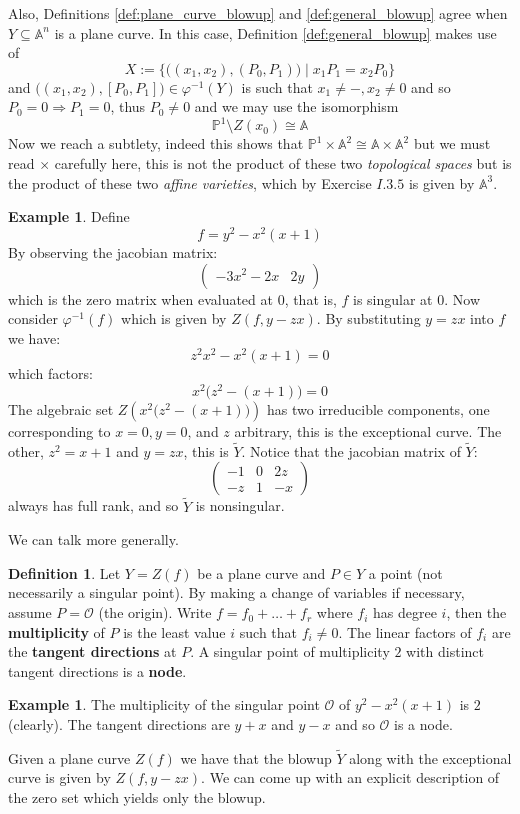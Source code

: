 \documentclass[12pt]{article}
\theoremstyle{plain}
\theoremstyle{definition}
\newtheorem{defn}[thm]{Definition} %
\newtheorem{example}[thm]{Example}
\newcommand{\bb}[1]{\mathbb{#1}}
\newcommand{\call}[1]{\mathcal{#1}}
\begin{document}
Also, Definitions \ref{def:plane_curve_blowup} and \ref{def:general_blowup} agree when $Y \subseteq \bb{A}^n$ is a plane curve. In this case, Definition \ref{def:general_blowup} makes use of
\[X := \lbrace \big((x_1,x_2),(P_0,P_1)\big) \mid x_1 P_1 = x_2 P_0\rbrace\]
and $\big((x_1,x_2),[P_0,P_1]\big) \in \varphi^{-1}(Y)$ is such that $x_1 \neq -, x_2 \neq 0$ and so $P_0 = 0 \Rightarrow P_1 = 0$, thus $P_0 \neq 0$ and we may use the isomorphism
\[\bb{P}^1\setminus Z(x_0) \cong \bb{A}\]
Now we reach a subtlety, indeed this shows that $\bb{P}^1 \times \bb{A}^2 \cong \bb{A} \times \bb{A}^2$ but we must read $\times$ carefully here, this is not the product of these two \emph{topological spaces} but is the product of these two \emph{affine varieties}, which by Exercise $I.3.5$ is given by $\bb{A}^3$.

\begin{example}
Define 
$$f = y^2 - x^2(x+1)$$
By observing the jacobian matrix:
\[
\begin{pmatrix}
-3x^2 -2x & 2y
\end{pmatrix}
\]
which is the zero matrix when evaluated at $0$, that is, $f$ is singular at $0$. Now consider $\varphi^{-1}(f)$ which is given by $Z(f,y - zx)$. By substituting $y = zx$ into $f$ we have:
\[z^2x^2 - x^2(x + 1) = 0\]
which factors:
\[x^2\big(z^2 - (x+1)\big) = 0\]
The algebraic set $Z(x^2\big(z^2 - (x+1)\big))$ has two irreducible components, one corresponding to $x = 0, y = 0$, and $z$ arbitrary, this is the exceptional curve. The other, $z^2 = x + 1$ and $y = zx$, this is $\tilde{Y}$. Notice that the jacobian matrix of $\tilde{Y}$:
\[
\begin{pmatrix}
-1 & 0 & 2z\\
-z & 1 & -x
\end{pmatrix}
\]
always has full rank, and so $\tilde{Y}$ is nonsingular.
\end{example}
We can talk more generally.
\begin{defn}
Let $Y = Z(f)$ be a plane curve and $P \in Y$ a point (not necessarily a singular point). By making a change of variables if necessary, assume $P = \call{O}$ (the origin). Write $f = f_0 + \hdots + f_r$ where $f_i$ has degree $i$, then the \textbf{multiplicity} of $P$ is the least value $i$ such that $f_i \neq 0$. The linear factors of $f_i$ are the \textbf{tangent directions} at $P$. A singular point of multiplicity $2$ with distinct tangent directions is a \textbf{node}.
\end{defn}
\begin{example}
The multiplicity of the singular point $\call{O}$ of $y^2 - x^2(x + 1)$ is $2$ (clearly). The tangent directions are $y + x$ and $y - x$ and so $\call{O}$ is a node.
\end{example}
Given a plane curve $Z(f)$ we have that the blowup $\tilde{Y}$ along with the exceptional curve is given by $Z(f,y - zx)$. We can come up with an explicit description of the zero set which yields only the blowup.
\end{document}
